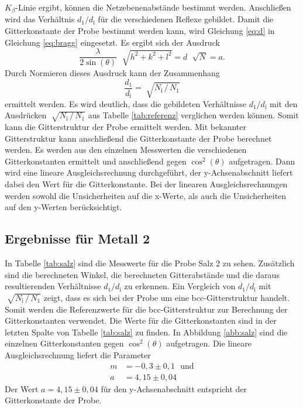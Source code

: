 $K_\beta$-Linie ergibt, können die Netzebenenabstände bestimmt werden. Anschließen wird das Verhältnis $d_1 / d_\text{i}$ für die verschiedenen Reflexe gebildet.\newline
Damit die Gitterkonstante der Probe bestimmt werden kann, wird Gleichung \eqref{eq:d} in Gleichung \eqref{eq:bragg} eingesetzt. Es ergibt sich der Ausdruck
\begin{equation}
  \frac{\lambda}{2\sin(\theta)}\,\,\sqrt[]{h^2+k^2+l^2}=d\,\,\sqrt[]{N}=a.
\end{equation}
Durch Normieren dieses Ausdruck kann der Zusammenhang
\begin{equation}
\frac{d_1}{d_\text{i}}=\sqrt[]{N_\text{i}\, / \, N_1}
\end{equation}
ermittelt werden. Es wird deutlich, dass die gebildeten Verhältnisse $d_1 / d_\text{i}$ mit den Ausdrücken $\sqrt[]{N_\text{i}\, / \, N_1}$ aus Tabelle
\ref{tab:referenz} verglichen werden können. Somit kann die Gitterstruktur der Probe ermittelt werden.
Mit bekannter Gitterstruktur kann anschließend die Gitterkonstante der Probe berechnet werden. Es werden aus den einzelnen Messwerten die verschiedenen
Gitterkonstanten ermittelt und anschließend gegen $\cos^2(\theta)$ aufgetragen. Dann wird eine lineare Ausgleichsrechnung durchgeführt, der y-Achsenabschnitt
liefert dabei den Wert für die Gitterkonstante. Bei der linearen Ausgleichsrechnungen werden sowohl die Unsicherheiten auf die x-Werte, als auch die Unsicherheiten auf
den y-Werten berücksichtigt.

\subsection{Ergebnisse für Metall 2}

In Tabelle \ref{tab:salz} sind die Messwerte für die Probe Salz 2 zu sehen. Zusätzlich sind die berechneten Winkel, die berechneten Gitterabstände und die
daraus resultierenden Verhältnisse $d_1 / d_\text{i}$ zu erkennen.\newline
Ein Vergleich von $d_1 / d_\text{i}$ mit $\sqrt[]{N_\text{i}\, / \, N_1}$ zeigt, dass es sich bei der Probe um eine bcc-Gitterstruktur handelt.
Somit werden die
Referenzwerte für die bcc-Gitterstruktur zur Berechnung der Gitterkonstanten verwendet. Die Werte für die Gitterkonstanten sind in der letzten Spalte von
Tabelle \ref{tab:salz} zu finden. In Abbildung \ref{abb:salz} sind die einzelnen Gitterkonstanten gegen $\cos^2(\theta)$ aufgetragen. Die lineare Ausgleichsrechnung liefert
die Parameter
\begin{align*}
  m &= -0,3\pm0,1~~~\text{und}\\
  a &= 4,15\pm0,04
\end{align*}
Der Wert $a = 4,15\pm0,04$ für den y-Achsenabschnitt entspricht der Gitterkonstante der Probe.


